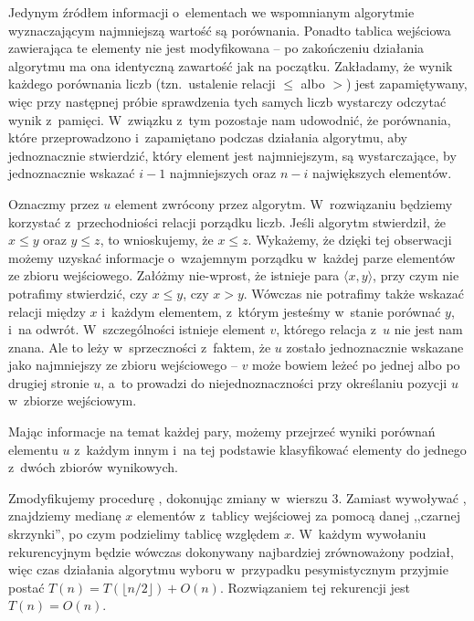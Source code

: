\exercise %
Jedynym źródłem informacji o~elementach we wspomnianym algorytmie wyznaczającym  najmniejszą wartość są porównania.
Ponadto tablica wejściowa zawierająca te elementy nie jest modyfikowana -- po zakończeniu działania algorytmu ma ona identyczną zawartość jak na początku.
Zakładamy, że wynik każdego porównania liczb (tzn.\ ustalenie relacji $\le$ albo $>$) jest zapamiętywany, więc przy następnej próbie sprawdzenia tych samych liczb wystarczy odczytać wynik z~pamięci.
W~związku z~tym pozostaje nam udowodnić, że porównania, które przeprowadzono i~zapamiętano podczas działania algorytmu, aby jednoznacznie stwierdzić, który element jest  najmniejszym, są wystarczające, by jednoznacznie wskazać $i-1$ najmniejszych oraz $n-i$ największych elementów.

Oznaczmy przez $u$ element zwrócony przez algorytm.
W~rozwiązaniu będziemy korzystać z~przechodniości relacji porządku liczb.
Jeśli algorytm stwierdził, że $x\le y$ oraz $y\le z$, to wnioskujemy, że $x\le z$.
Wykażemy, że dzięki tej obserwacji możemy uzyskać informacje o~wzajemnym porządku w~każdej parze elementów ze zbioru wejściowego.
Załóżmy nie-wprost, że istnieje para $\langle x,y\rangle$, przy czym nie potrafimy stwierdzić, czy $x\le y$, czy $x>y$.
Wówczas nie potrafimy także wskazać relacji między $x$ i~każdym elementem, z~którym jesteśmy w~stanie porównać $y$, i~na odwrót.
W~szczególności istnieje element $v$, którego relacja z~$u$ nie jest nam znana.
Ale to leży w~sprzeczności z~faktem, że $u$ zostało jednoznacznie wskazane jako  najmniejszy ze zbioru wejściowego -- $v$ może bowiem leżeć po jednej albo po drugiej stronie $u$, a~to prowadzi do niejednoznaczności przy określaniu pozycji $u$ w~zbiorze wejściowym.

Mając informacje na temat każdej pary, możemy przejrzeć wyniki porównań elementu $u$ z~każdym innym i~na tej podstawie klasyfikować elementy do jednego z~dwóch zbiorów wynikowych.

\exercise %
Zmodyfikujemy procedurę , dokonując zmiany w~wierszu 3.
Zamiast wywoływać , znajdziemy medianę $x$ elementów z~tablicy wejściowej za pomocą danej ,,czarnej skrzynki'', po czym podzielimy tablicę względem $x$.
W~każdym wywołaniu rekurencyjnym będzie wówczas dokonywany najbardziej zrównoważony podział, więc czas działania algorytmu wyboru w~przypadku pesymistycznym przyjmie postać $T(n)=T(\lfloor n/2\rfloor)+O(n)$.
Rozwiązaniem tej rekurencji jest $T(n)=O(n)$.

